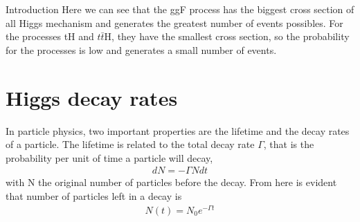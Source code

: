 \begin{chapter}{Introduction}
Here we can see that the ggF process has the biggest cross section of all Higgs mechanism and generates the greatest number of events possibles. For the processes tH and $t\bar{t}$H, they have the smallest cross section, so the probability for the processes is low and generates a small number of events. 
\pagebreak

\section{Higgs decay rates}
In particle physics, two important properties are the lifetime and the decay rates of a particle. The lifetime is related to the total decay rate $\Gamma$, that is the probability per unit of time a particle will decay, 
\begin{align}
  dN=-\Gamma N dt
\end{align}
with N the original number of particles before the decay. From here is evident that number of particles left in a decay is 
\begin{align}
N(t)=N_0 e^{-\Gamma t}
\end{align}



\end{chapter}

